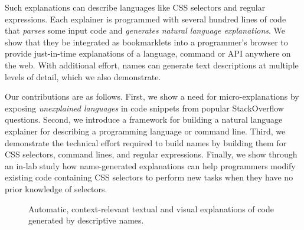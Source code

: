 Such explanations can describe languages like CSS selectors and regular expressions.
Each explainer is programmed with several hundred lines of code that \emph{parses} some input code and \emph{generates natural language explanations}.
We show that they be integrated as bookmarklets into a programmer's browser to provide just-in-time explanations of a language, command or API anywhere on the web.
With additional effort, \glspl{name} can generate text descriptions at multiple levels of detail, which we also demonstrate.

Our contributions are as follows.
First, we show a need for micro-explanations by exposing \emph{unexplained languages} in code snippets from popular StackOverflow questions.
Second, we introduce a framework for building a natural language explainer for describing a programming language or command line.
Third, we demonstrate the technical effort required to build \glspl{name} by building them for CSS selectors, command lines, and regular expressions.
Finally, we show through an in-lab study how \gls{name}-generated explanations can help programmers modify existing code containing CSS selectors to perform new tasks when they have no prior knowledge of selectors.

\begin{figure}[!t]
\label{fig:tutorons}
\caption{Automatic, context-relevant textual and visual explanations of code generated by descriptive \glspl{name}.}
\end{figure}
